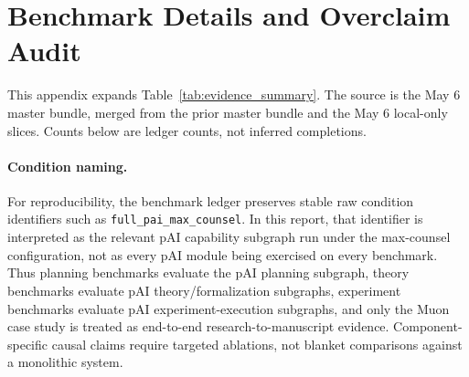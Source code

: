 \documentclass{article}
\begin{document}
\appendix

\section{Benchmark Details and Overclaim Audit}
\label{app:benchmark_details}
This appendix expands Table~\ref{tab:evidence_summary}. The source is the May 6 master bundle, merged from the prior master bundle and the May 6 local-only slices. Counts below are ledger counts, not inferred completions.

\paragraph{Condition naming.}
For reproducibility, the benchmark ledger preserves stable raw condition identifiers such as \texttt{full\_pai\_max\_counsel}. In this report, that identifier is interpreted as the relevant pAI capability subgraph run under the max-counsel configuration, not as every pAI module being exercised on every benchmark. Thus planning benchmarks evaluate the pAI planning subgraph, theory benchmarks evaluate pAI theory/formalization subgraphs, experiment benchmarks evaluate pAI experiment-execution subgraphs, and only the Muon case study is treated as end-to-end research-to-manuscript evidence. Component-specific causal claims require targeted ablations, not blanket comparisons against a monolithic system.
\end{document}
